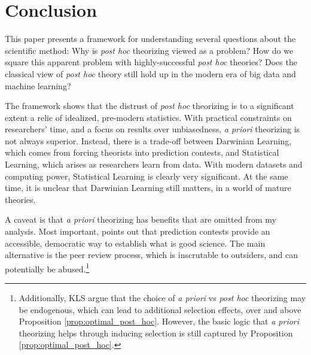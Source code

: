 \documentclass[12pt,english]{article}
\theoremstyle{plain}
\theoremstyle{plain}
\begin{document}
\section{Conclusion}

This paper presents a framework for understanding several questions about the scientific method: Why is \emph{post hoc} theorizing viewed as a problem? 
How do we square this apparent problem with highly-successful \emph{post hoc} theories? Does the classical view of \emph{post hoc} theory still hold up in the modern era of big data and machine learning? 

The framework shows that the distrust of \emph{post hoc} theorizing is to a significant extent a relic of  idealized, pre-modern statistics. With practical constraints on researchers' time, and a focus on results over unbiasedness, \emph{a priori} theorizing is not always superior. Instead, there is a trade-off between  Darwinian Learning, which comes from forcing theorists into prediction contests, and Statistical Learning, which arises as researchers learn from data. With  modern datasets and computing power, Statistical Learning is clearly very significant. At the same time, it is unclear that Darwinian Learning still matters, in a world of mature theories.

A caveat is that \emph{a priori} theorizing has benefits that are omitted from my analysis. Most important, \citet{barnes2008paradox} points out that prediction contests provide an accessible, democratic way to establish what is good science. The main alternative is the peer review process, which is inscrutable to outsiders, and can potentially be abused.\footnote{Additionally, KLS argue that the choice of \emph{a priori} vs \emph{post hoc} theorizing may be endogenous, which can lead to additional selection effects, over and above Proposition \ref{prop:optimal_post_hoc}. However, the basic logic that \emph{a priori} theorizing helps through inducing selection is still captured by Proposition \ref{prop:optimal_post_hoc}.}
\end{document}
